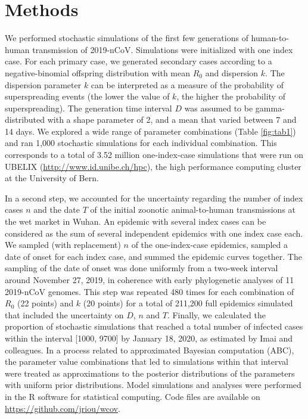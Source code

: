 \documentclass{article}
\begin{document}
\section{Methods}
We performed stochastic simulations of the first few generations of human-to-human transmission of 2019-nCoV. 
Simulations were initialized with one index case.
For each primary case, we generated secondary cases according to a negative-binomial offspring distribution with mean $R_0$ and dispersion $k$.\cite{Lloyd-Smith:2005,Althaus:2015b}
The dispersion parameter $k$ can be interpreted as a measure of the probability of superspreading events (the lower the value of $k$, the higher the probability of superspreading).
The generation time interval $D$ was assumed to be gamma-distributed with a shape parameter of 2, and a mean that varied between 7 and 14 days.
We explored a wide range of parameter combinations (Table \ref{fig:tab1}) and ran 1,000 stochastic simulations for each individual combination. 
This corresponds to a total of 3.52 million one-index-case simulations that were run on UBELIX (\url{http://www.id.unibe.ch/hpc}), the high performance computing cluster at the University of Bern. 

In a second step, we accounted for the uncertainty regarding the number of index cases $n$ and the date $T$ of the initial zoonotic animal-to-human transmissions at the wet market in Wuhan. 
An epidemic with several index cases can be considered as the sum of several independent epidemics with one index case each.
We sampled (with replacement) $n$ of the one-index-case epidemics, sampled a date of onset for each index case, and summed the epidemic curves together.
The sampling of the date of onset was done uniformly from a two-week interval around November 27, 2019, in coherence with early phylogenetic analyses of 11 2019-nCoV genomes.\cite{Rambaut:2020}
This step was repeated 480 times for each combination of $R_0$ (22 points) and $k$ (20 points) for a total of 211,200 full epidemics simulated that included the uncertainty on $D$, $n$ and $T$.
Finally, we calculated the proportion of stochastic simulations that reached a total number of infected cases within the interval [1000, 9700] by January 18, 2020, as estimated by Imai and colleagues.\cite{Imai:2020}
In a process related to approximated Bayesian computation (ABC), the parameter value combinations that led to simulations within that interval were treated as approximations to the posterior distributions of the parameters with uniform prior distributions.
Model simulations and analyses were performed in the R software for statistical computing.\cite{R:2018} 
Code files are available on \url{https://github.com/jriou/wcov}.
\end{document}
